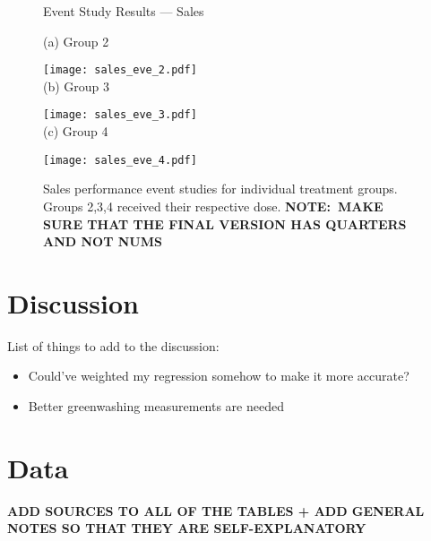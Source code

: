 \documentclass[12pt]{article}
\begin{document}
\begin{figure}
    \caption{Event Study Results --- Sales}
    \centering

    (a) Group 2
    
    \texttt{[image: sales\_eve\_2.pdf]} \\
    
    (b) Group 3
    
    \texttt{[image: sales\_eve\_3.pdf]} \\
    
    (c) Group 4
    
    \texttt{[image: sales\_eve\_4.pdf]}
    
    \captionsetup{font=footnotesize}
    \caption*{Sales performance event studies for individual treatment groups. Groups 2,3,4 received their respective dose. \textbf{NOTE:~MAKE SURE THAT THE FINAL VERSION HAS QUARTERS AND NOT NUMS}}
\end{figure}


\newpage


\section{Discussion}\label{sect:discussion}

List of things to add to the discussion:
\begin{itemize}
    \item Could've weighted my regression somehow to make it more accurate?
    \item Better greenwashing measurements are needed

\end{itemize}


\pagebreak
\printbibliography{}
\pagebreak
\appendix

\section{Data}\label{app:data}

\textbf{ADD SOURCES TO ALL OF THE TABLES + ADD GENERAL NOTES SO THAT THEY ARE SELF-EXPLANATORY}
\end{document}
